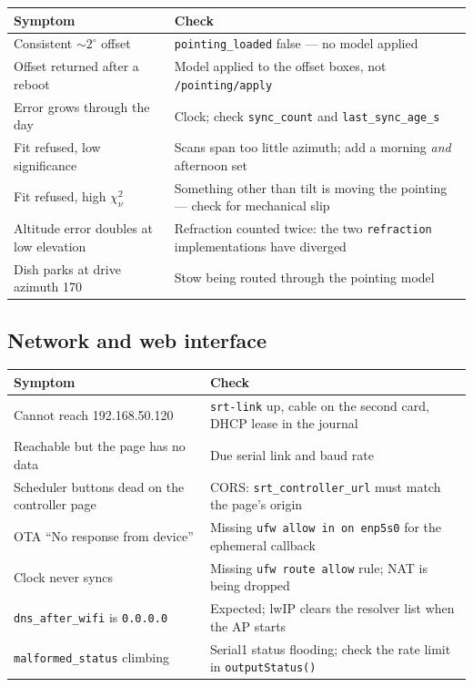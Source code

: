 \documentclass[11pt,a4paper]{article}
\begin{document}
\begin{table}[H]
\centering
\small
\begin{tabular}{p{5.4cm}p{9.2cm}}
\toprule
\textbf{Symptom} & \textbf{Check} \\
\midrule
Consistent $\sim2^\circ$ offset & \texttt{pointing\_loaded} false --- no model applied \\
Offset returned after a reboot & Model applied to the offset boxes, not \texttt{/pointing/apply} \\
Error grows through the day & Clock; check \texttt{sync\_count} and \texttt{last\_sync\_age\_s} \\
Fit refused, low significance & Scans span too little azimuth; add a morning \emph{and} afternoon set \\
Fit refused, high $\chi^2_\nu$ & Something other than tilt is moving the pointing --- check for mechanical slip \\
Altitude error doubles at low elevation & Refraction counted twice: the two \texttt{refraction} implementations have diverged \\
Dish parks at drive azimuth 170 & Stow being routed through the pointing model \\
\bottomrule
\end{tabular}
\end{table}

\subsection{Network and web interface}

\begin{table}[H]
\centering
\small
\begin{tabular}{p{5.4cm}p{9.2cm}}
\toprule
\textbf{Symptom} & \textbf{Check} \\
\midrule
Cannot reach 192.168.50.120 & \texttt{srt-link} up, cable on the second card, DHCP lease in the journal \\
Reachable but the page has no data & Due serial link and baud rate \\
Scheduler buttons dead on the controller page & CORS: \texttt{srt\_controller\_url} must match the page's origin \\
OTA ``No response from device'' & Missing \texttt{ufw allow in on enp5s0} for the ephemeral callback \\
Clock never syncs & Missing \texttt{ufw route allow} rule; NAT is being dropped \\
\texttt{dns\_after\_wifi} is \texttt{0.0.0.0} & Expected; lwIP clears the resolver list when the AP starts \\
\texttt{malformed\_status} climbing & Serial1 status flooding; check the rate limit in \texttt{outputStatus()} \\
\bottomrule
\end{tabular}
\end{table}
\end{document}
